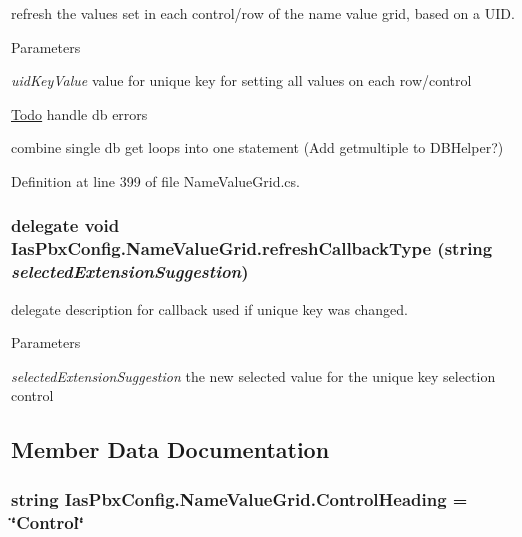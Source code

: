 refresh the values set in each control/row of the name value grid, based on a UID. 
\begin{DoxyParams}{Parameters}
\item[{\em uidKeyValue}]value for unique key for setting all values on each row/control \end{DoxyParams}
\begin{Desc}
\item[\hyperlink{todo__todo000042}{Todo}]handle db errors 

combine single db get loops into one statement (Add getmultiple to DBHelper?) \end{Desc}


Definition at line 399 of file NameValueGrid.cs.\hypertarget{class_ias_pbx_config_1_1_name_value_grid_acb2383247682f790d011f8840068a252}{
\subsubsection[{refreshCallbackType}]{\setlength{\rightskip}{0pt plus 5cm}delegate void IasPbxConfig.NameValueGrid.refreshCallbackType (string {\em selectedExtensionSuggestion})}}
\label{class_ias_pbx_config_1_1_name_value_grid_acb2383247682f790d011f8840068a252}


delegate description for callback used if unique key was changed. 
\begin{DoxyParams}{Parameters}
\item[{\em selectedExtensionSuggestion}]the new selected value for the unique key selection control \end{DoxyParams}


\subsection{Member Data Documentation}
\hypertarget{class_ias_pbx_config_1_1_name_value_grid_a9ce813f75fb383103a34150e0e7643e5}{
\subsubsection[{ControlHeading}]{\setlength{\rightskip}{0pt plus 5cm}string {\bf IasPbxConfig.NameValueGrid.ControlHeading} = \char`\"{}Control\char`\"{}}}
\label{class_ias_pbx_config_1_1_name_value_grid_a9ce813f75fb383103a34150e0e7643e5}


